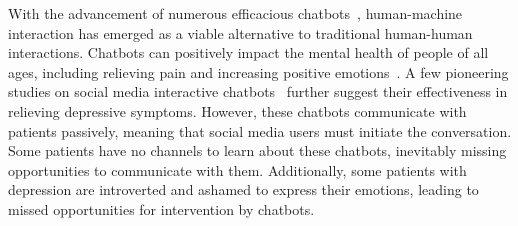 With the advancement of numerous efficacious chatbots~\cite{ahmed2023chatbot}, human-machine interaction has emerged as a viable alternative to traditional human-human interactions. Chatbots can positively impact the mental health of people of all ages, including relieving pain and increasing positive emotions~\cite{chen2018social, kabacinska2021socially, miner2016conversational}. A few pioneering studies on social media interactive chatbots~\cite{kaywan2023early, chenbt5153} further suggest their effectiveness in relieving depressive symptoms.
However, these chatbots communicate with patients passively, meaning that social media users must initiate the conversation. Some patients have no channels to learn about these chatbots, inevitably missing opportunities to communicate with them. Additionally, some patients with depression are introverted and ashamed to express their emotions, leading to missed opportunities for intervention by chatbots.





